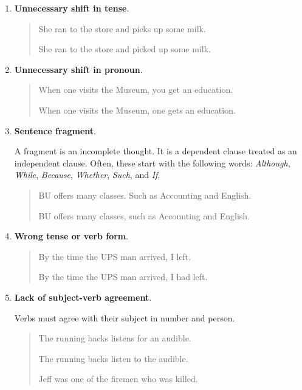 \begin{enumerate}
\item \textbf{Unnecessary shift in tense}.

\begin{quote}
She ran to the store and picks up some milk.      

She ran to the store and picked up some milk.      
\end{quote}

\item \textbf{Unnecessary shift in pronoun}.

\begin{quote}
When one visits the Museum, you get an education.      

When one visits the Museum, one gets an education.      

\end{quote}

\item  \textbf{Sentence fragment}.

A fragment is an incomplete thought. It is a dependent clause treated as an independent clause. Often, these start with the following words: \emph{Although}, \emph{While}, \emph{Because}, \emph{Whether}, \emph{Such}, and \emph{If}.

\begin{quote}
BU offers many classes. Such as Accounting and English.      

BU offers many classes, such as Accounting and English.      
\end{quote}

\item \textbf{Wrong tense or verb form}.

\begin{quote}
By the time the UPS man arrived, I left.      

By the time the UPS man arrived, I had left.      
\end{quote}
\item\textbf{ Lack of subject-verb agreement}.

Verbs must agree with their subject in number and person. 

\begin{quote}
The running backs listens for an audible.      

The running backs listen to the audible.      

Jeff was one of the firemen who was killed.      


\end{quote}
\end{enumerate}
